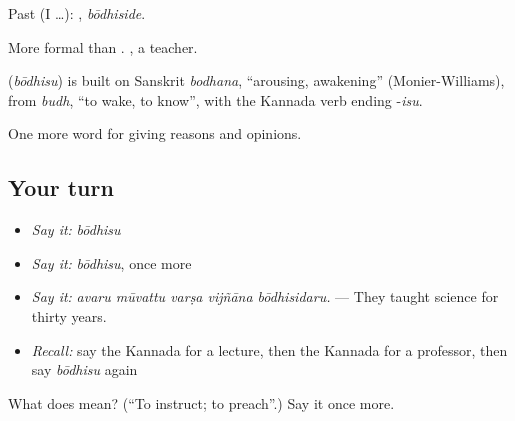 Past (I …): , \emph{bōdhiside}.

More formal than . , a teacher.

\begin{cousinweb}
\textbf{} (\emph{bōdhisu}) is built on Sanskrit \emph{bodhana}, \textquotedblleft{}arousing, awakening\textquotedblright{} (Monier-Williams), from \emph{budh}, \textquotedblleft{}to wake, to know\textquotedblright{}, with the Kannada verb ending -\emph{isu}.
\end{cousinweb}

\begin{grammarlens}[title={What you've built}]
One more word for giving reasons and opinions.
\end{grammarlens}

\subsection*{Your turn}
\begin{itemize}
\raggedright
  \item \emph{Say it:} \emph{bōdhisu}
  \item \emph{Say it:} \emph{bōdhisu}, once more
  \item \emph{Say it:} \emph{avaru mūvattu varṣa vijñāna bōdhisidaru.} — They taught science for thirty years.
  \item \emph{Recall:} say the Kannada for a lecture, then the Kannada for a professor, then say \emph{bōdhisu} again
\end{itemize}

\begin{tcolorbox}[breakable,colback=teal!4,colframe=teal!35!black,title={Before you move on}]
What does  mean? (\textquotedblleft{}To instruct; to preach\textquotedblright{}.) Say it once more.
\end{tcolorbox}
